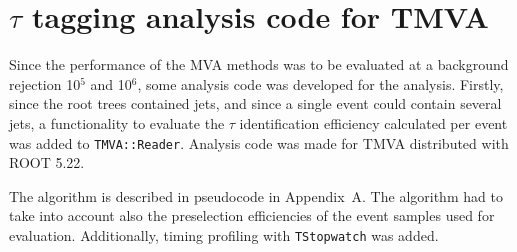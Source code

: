 \documentclass[a4paper]{jpconf}
\begin{document}






 


\section{$\tau$ tagging analysis code for TMVA }\label{sec:code}
Since the performance of the MVA methods was to be evaluated at a
background rejection 10$^{5}$ and 10$^{6}$, 
some analysis code was developed for the analysis.
Firstly, since the root trees contained jets, and since a single event
could contain several jets, a functionality to evaluate the $\tau$
identification efficiency calculated per event was added to  {\tt TMVA::Reader}.  
Analysis code was made for TMVA distributed with ROOT 5.22.


The algorithm is described in pseudocode in
Appendix~A. %
The algorithm had to take into account also the preselection
efficiencies of the event samples used for evaluation. Additionally,
timing profiling with {\tt TStopwatch} was added.
\end{document}
